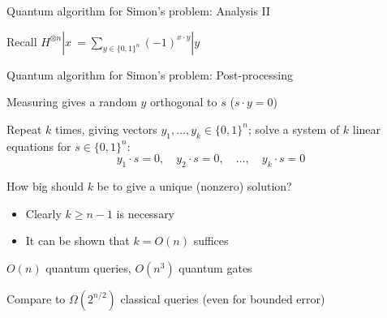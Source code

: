 \begin{frame}{Quantum algorithm for Simon's problem: Analysis II}

Recall $H^{\otimes n}|x\> = \sum_{y \in \{0,1\}^n} (-1)^{x \cdot y} |y\>$



\bigskip


\end{frame}


\begin{frame}{Quantum algorithm for Simon's problem: Post-processing}
  
Measuring gives a random $y$ orthogonal to $s$ ($s \cdot y = 0$)

\pause
\bigskip

Repeat $k$ times, giving vectors $y_1,\ldots,y_k \in \{0,1\}^n$; solve a system of $k$ linear equations for $s \in \{0,1\}^n$:
\[
y_1 \cdot s = 0,\quad y_2 \cdot s = 0, \quad \ldots, \quad y_k \cdot s = 0
\]

\bigskip

How big should $k$ be to give a unique (nonzero) solution? \pause
\begin{itemize}
  \item Clearly $k \ge n-1$ is necessary
  \item It can be shown that $k = O(n)$ suffices
\end{itemize}

\pause
\bigskip

$O(n)$ quantum queries, $O(n^3)$ quantum gates

\pause
\bigskip

Compare to $\Omega(2^{n/2})$ classical queries (even for bounded error)

\end{frame}

